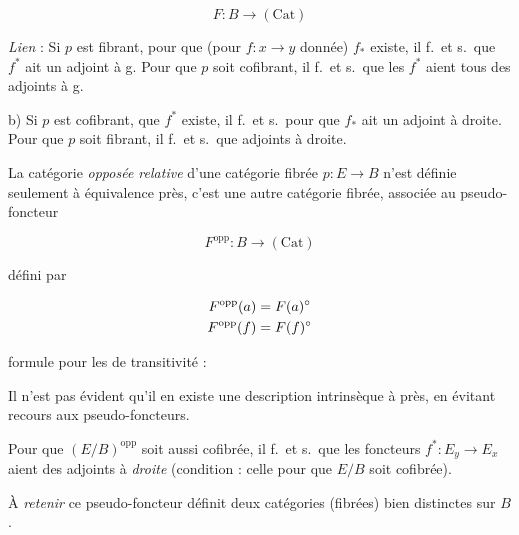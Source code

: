 \documentclass[11pt,a4paper]{article}
\begin{document}
\[ F : B \longrightarrow (\mathrm{Cat}) \]

\emph{Lien} : Si $p$ est fibrant, pour que (pour $f : x \to y$ donnée) $f_{*}$
existe, il f.\ et s.\ que $f^{*}$ ait un adjoint à g. Pour que $p$ soit
cofibrant, il f.\ et s.\ que les $f^{*}$ aient tous des adjoints à g.

b) Si $p$ est cofibrant, \ill{} que $f^{*}$ existe, il f.\ et s.\ pour que
$f_{*}$ ait un adjoint à droite. Pour que $p$ soit fibrant, il f.\ et s.\ que
\ill{} adjoints à droite.

La catégorie \emph{opposée relative} d'une catégorie fibrée $p : E \to B$ n'est
définie seulement à équivalence près, c'est une autre catégorie fibrée,
associée au pseudo-foncteur


\[ F^{\mathrm{opp}} : B \longrightarrow (\mathrm{Cat}) \]

défini par

\begin{align}
F^{\mathrm{opp}}(a) &= F(a)^{\circ} \notag \\
F^{\mathrm{opp}}(f) &= F(f)^{\circ} \notag
\end{align}

\ill{} formule \ill{} pour \ill{} les \ill{} de transitivité :

Il n'est pas évident qu'il en existe une description intrinsèque à \ill{} près,
en évitant \ill{} recours aux pseudo-foncteurs.

Pour que $(E/B)^{\mathrm{opp}}$ soit aussi cofibrée, il f.\ et s.\ que les
foncteurs $f^{*} : E_{y} \to E_{x}$ aient des adjoints à \emph{droite}
(condition  : celle pour que $E/B$ soit cofibrée).

À \emph{retenir}  ce pseudo-foncteur définit deux catégories
(fibrées) bien distinctes sur $B$.
\end{document}
